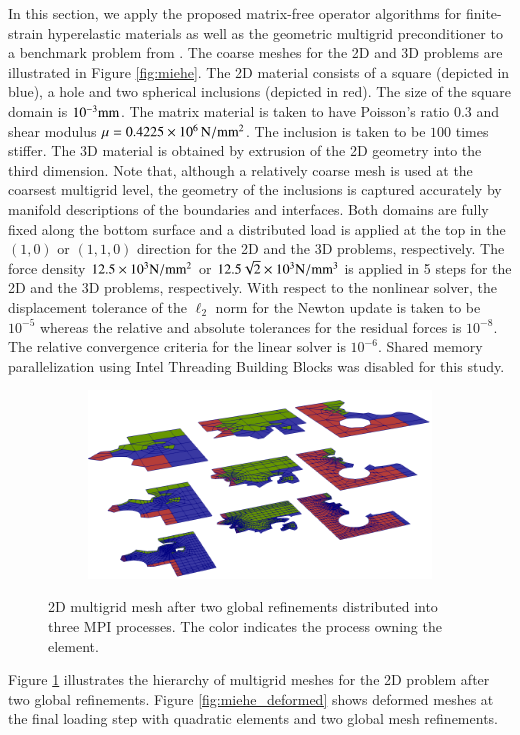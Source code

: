 \documentclass[preprint,12pt,times]{elsarticle}
\begin{document}
In this section, we apply the proposed matrix-free operator algorithms for finite-strain hyperelastic materials as well as the geometric multigrid preconditioner to a benchmark problem from \cite{Miehe2007}. The coarse meshes for the 2D and 3D problems are illustrated in Figure \ref{fig:miehe}. The 2D material consists of a square (depicted in blue), a hole and two spherical inclusions (depicted in red). The size of the square domain is $10^{-3} \rm{mm}$.
The matrix material is taken to have Poisson's ratio $0.3$ and shear modulus $\mu=0.4225 \times 10^6\, \rm{N/mm^2}$. The inclusion is taken to be $100$ times stiffer.
The 3D material is obtained by extrusion of the 2D geometry into the third dimension.
Note that, although a relatively coarse mesh is used at the coarsest multigrid level, the geometry of the inclusions is captured accurately by manifold descriptions of the boundaries and interfaces.
Both domains are fully fixed along the bottom surface and a distributed load is applied at the top in the $(1,0)$ or $(1,1,0)$ direction for the 2D and the 3D problems, respectively.
The force density $12.5 \times 10^3 \rm{N/mm^2}$ or $12.5 \sqrt{2} \times 10^3 \rm{N/mm^3}$ is applied in 5 steps for the 2D and the 3D problems, respectively.
With respect to the nonlinear solver, the displacement tolerance of the $\mathcal{\ell}_2$ norm for the Newton update is taken to be $10^{-5}$ whereas the relative and absolute tolerances for the residual forces is $10^{-8}$. The relative convergence criteria for the linear solver is $10^{-6}$.
Shared memory parallelization using Intel Threading Building Blocks was disabled for this study.


\begin{figure}[!ht]
  \centering
  \begin{subfigure}[b]{0.8\textwidth}
    \centering
    \includegraphics[width=\textwidth]{gmg_2d.png}
  \end{subfigure}
  \caption{2D multigrid mesh after two global refinements distributed into three MPI processes. The color indicates the process owning the element.}%
  \label{fig:miehe_gmg}
\end{figure}
%
Figure \ref{fig:miehe_gmg} illustrates the hierarchy of multigrid meshes for the 2D problem after two global refinements.
Figure \ref{fig:miehe_deformed} shows deformed meshes at the final loading step with quadratic elements and two global mesh refinements.
\end{document}

